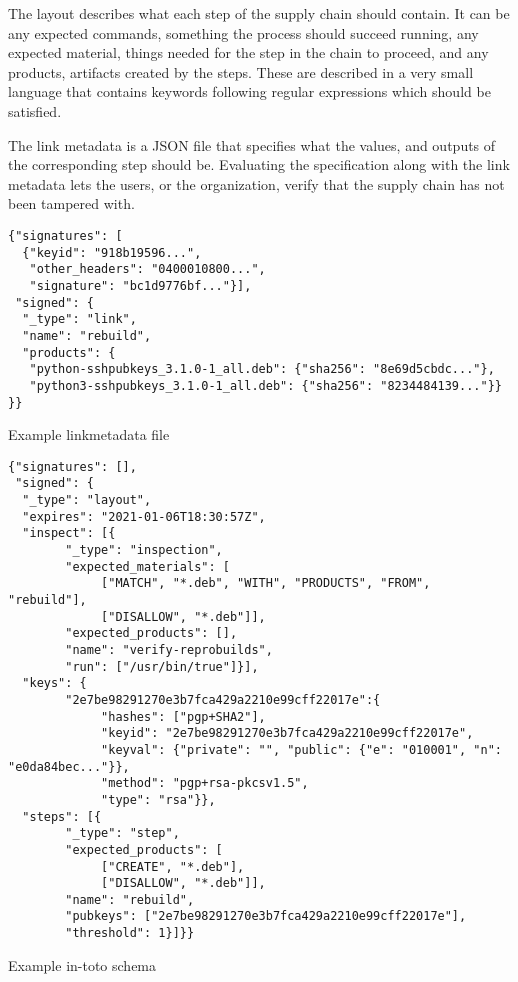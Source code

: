 \documentclass[../Main/thesis.tex]{subfiles}
\begin{document}
The layout describes what each step of the supply chain should contain. It can
be any expected commands, something the process should succeed running, any
expected material, things needed for the step in the chain to proceed, and any
products, artifacts created by the steps. These are described in a very small
language that contains keywords following regular expressions which should be
satisfied.

The link metadata is a JSON file that specifies what the values, and outputs of
the corresponding step should be. Evaluating the specification along with the
link metadata lets the users, or the organization, verify that the supply chain
has not been tampered with. 


\begin{listing}[H]
\begin{verbatim}
{"signatures": [
  {"keyid": "918b19596...",
   "other_headers": "0400010800...",
   "signature": "bc1d9776bf..."}],
 "signed": {
  "_type": "link",
  "name": "rebuild",
  "products": {
   "python-sshpubkeys_3.1.0-1_all.deb": {"sha256": "8e69d5cbdc..."},
   "python3-sshpubkeys_3.1.0-1_all.deb": {"sha256": "8234484139..."}}
}}
\end{verbatim}
\caption{Example linkmetadata file}
\label{lst:linkmetadata}
\end{listing}

\begin{listing}[H]
\begin{verbatim}
{"signatures": [],
 "signed": {
  "_type": "layout",
  "expires": "2021-01-06T18:30:57Z",
  "inspect": [{
        "_type": "inspection",
        "expected_materials": [
             ["MATCH", "*.deb", "WITH", "PRODUCTS", "FROM", "rebuild"],
             ["DISALLOW", "*.deb"]],
        "expected_products": [],
        "name": "verify-reprobuilds",
        "run": ["/usr/bin/true"]}],
  "keys": {
        "2e7be98291270e3b7fca429a2210e99cff22017e":{
             "hashes": ["pgp+SHA2"],
             "keyid": "2e7be98291270e3b7fca429a2210e99cff22017e",
             "keyval": {"private": "", "public": {"e": "010001", "n": "e0da84bec..."}},
             "method": "pgp+rsa-pkcsv1.5",
             "type": "rsa"}},
  "steps": [{
        "_type": "step",
        "expected_products": [
             ["CREATE", "*.deb"],
             ["DISALLOW", "*.deb"]],
        "name": "rebuild",
        "pubkeys": ["2e7be98291270e3b7fca429a2210e99cff22017e"],
        "threshold": 1}]}}
\end{verbatim}
\caption{Example in-toto schema}
\label{lst:in-toto-schema}
\end{listing}
\end{document}
